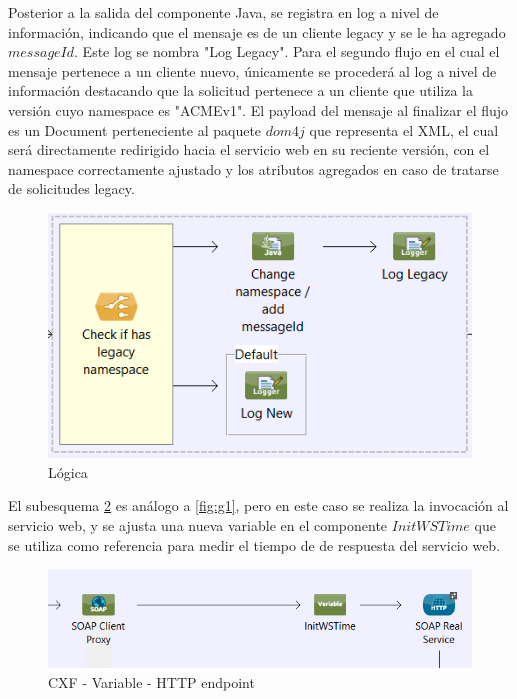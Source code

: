 \documentclass[12pt]{article}
\begin{document}
Posterior a la salida del componente Java, se registra en log a nivel de información, indicando que el mensaje es de un cliente legacy y se le ha agregado $messageId$. Este log se nombra "Log Legacy".
Para el segundo flujo en el cual el mensaje pertenece a un cliente nuevo, únicamente se procederá al log a nivel de información destacando que la solicitud pertenece a un cliente que utiliza la versión cuyo namespace es "ACMEv1".
El payload del mensaje al finalizar el flujo es un Document perteneciente al paquete $dom4j$ que representa el XML, el cual será directamente redirigido hacia el servicio web en su reciente versión, con el namespace correctamente ajustado y los atributos agregados en caso de tratarse de solicitudes legacy.

  \begin{figure}[!h]
  \centering
    \includegraphics[scale=0.7]{./images/g2.png}
  \caption{Lógica}
  \label{fig:g2}
\end{figure} 

El subesquema \ref{fig:g3} es análogo a \ref{fig:g1}, pero en este caso se realiza la invocación al servicio web, y se ajusta una nueva variable en el componente $InitWSTime$ que se utiliza como referencia para medir el tiempo de de respuesta del servicio web.

  \begin{figure}[!h]
  \centering
    \includegraphics[scale=0.6]{./images/g3.png}
  \caption{CXF - Variable - HTTP endpoint}
  \label{fig:g3}
\end{figure} 
\end{document}
